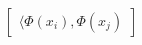 \documentclass[preview]{standalone}
\begin{document}
\begin{align*}
\begin{bmatrix}\langle \Phi(x_i) , \Phi(x_j)\end{bmatrix}
\end{align*}
\end{document}
